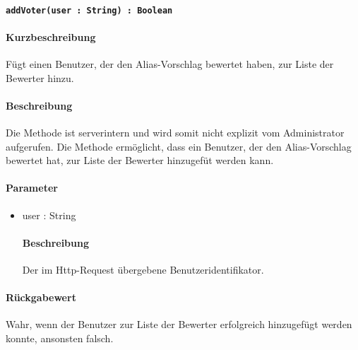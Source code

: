 \paragraph*{\texttt{addVoter(user : String) : Boolean}}%
\paragraph*{Kurzbeschreibung}
Fügt einen Benutzer, der den Alias-Vorschlag bewertet haben, zur Liste der Bewerter hinzu.
\paragraph*{Beschreibung}
Die Methode ist serverintern und wird somit nicht explizit vom Administrator aufgerufen.
Die Methode ermöglicht, dass ein Benutzer, der den Alias-Vorschlag bewertet hat, zur Liste der Bewerter hinzugefüt werden kann.
\paragraph*{Parameter}
\begin{itemize}
    \item user : String
    		\paragraph*{Beschreibung}
    		Der im Http-Request übergebene Benutzeridentifikator.
\end{itemize}
\paragraph*{Rückgabewert}
Wahr, wenn der Benutzer zur Liste der Bewerter erfolgreich hinzugefügt werden konnte, ansonsten falsch.
